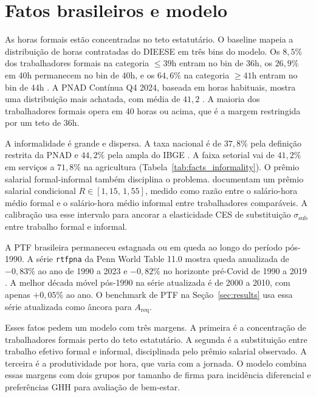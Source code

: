 \documentclass[10pt,twocolumn]{article}
\begin{document}
\section{Fatos brasileiros e modelo}\label{sec:framework}

As horas formais est\~ao concentradas no teto estatut\'ario. O baseline mapeia a distribui\c{c}\~ao de horas contratadas do DIEESE em tr\^es bins do modelo. Os $8{,}5\%$ dos trabalhadores formais na categoria $\leq 39$h entram no bin de 36h, os $26{,}9\%$ em 40h permanecem no bin de 40h, e os $64{,}6\%$ na categoria $\geq 41$h entram no bin de 44h \citep{DIEESE2024}. A PNAD Cont\'inua Q4 2024, baseada em horas habituais, mostra uma distribui\c{c}\~ao mais achatada, com m\'edia de $41{,}2$ \citep{PNAD2025}. A maioria dos trabalhadores formais opera em 40 horas ou acima, que \'e a margem restringida por um teto de 36h.

A informalidade \'e grande e dispersa. A taxa nacional \'e de $37{,}8\%$ pela defini\c{c}\~ao restrita da PNAD e $44{,}2\%$ pela ampla do IBGE \citep{PNAD2025}. A faixa setorial vai de $41{,}2\%$ em servi\c{c}os a $71{,}8\%$ na agricultura (Tabela~\ref{tab:facts_informality}). O pr\^emio salarial formal-informal tamb\'em disciplina o problema. \citet{MeghirNaritaRobin2015} documentam um pr\^emio salarial condicional $R\in[1{,}15,\,1{,}55]$, medido como raz\~ao entre o sal\'ario-hora m\'edio formal e o sal\'ario-hora m\'edio informal entre trabalhadores compar\'aveis. A calibra\c{c}\~ao usa esse intervalo para ancorar a elasticidade CES de substitui\c{c}\~ao $\sigma_{\text{sub}}$ entre trabalho formal e informal.

A PTF brasileira permaneceu estagnada ou em queda ao longo do per\'iodo p\'os-1990. A s\'erie \texttt{rtfpna} da Penn World Table 11.0 mostra queda anualizada de $-0{,}83\%$ ao ano de 1990 a 2023 e $-0{,}82\%$ no horizonte pr\'e-Covid de 1990 a 2019 \citep{FeenstraInklaarTimmer2015,PWT2025,FREDPWTBrazil2026}. A melhor d\'ecada m\'ovel p\'os-1990 na s\'erie atualizada \'e de 2000 a 2010, com apenas $+0{,}05\%$ ao ano. O benchmark de PTF na Se\c{c}\~ao~\ref{sec:results} usa essa s\'erie atualizada como \^ancora para $A_{\text{req}}$.

Esses fatos pedem um modelo com tr\^es margens. A primeira \'e a concentra\c{c}\~ao de trabalhadores formais perto do teto estatut\'ario. A segunda \'e a substitui\c{c}\~ao entre trabalho efetivo formal e informal, disciplinada pelo pr\^emio salarial observado. A terceira \'e a produtividade por hora, que varia com a jornada. O modelo combina essas margens com dois grupos por tamanho de firma para incid\^encia diferencial e prefer\^encias GHH para avalia\c{c}\~ao de bem-estar.
\end{document}
